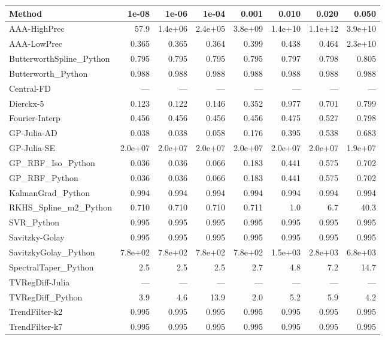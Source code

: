 \documentclass[10pt]{article}
\begin{document}
\begin{longtable}{lrrrrrrr}
\toprule
\textbf{Method} & \textbf{1e-08} & \textbf{1e-06} & \textbf{1e-04} & \textbf{0.001} & \textbf{0.010} & \textbf{0.020} & \textbf{0.050} \\
\midrule
\endhead
AAA-HighPrec & 57.9 & 1.4e+06 & 2.4e+05 & 3.8e+09 & 1.4e+10 & 1.1e+12 & 3.9e+10 \\
AAA-LowPrec & 0.365 & 0.365 & 0.364 & 0.399 & 0.438 & 0.464 & 2.3e+10 \\
ButterworthSpline\_Python & 0.795 & 0.795 & 0.795 & 0.795 & 0.797 & 0.798 & 0.805 \\
Butterworth\_Python & 0.988 & 0.988 & 0.988 & 0.988 & 0.988 & 0.988 & 0.988 \\
Central-FD & --- & --- & --- & --- & --- & --- & --- \\
Dierckx-5 & 0.123 & 0.122 & 0.146 & 0.352 & 0.977 & 0.701 & 0.799 \\
Fourier-Interp & 0.456 & 0.456 & 0.456 & 0.456 & 0.475 & 0.527 & 0.798 \\
GP-Julia-AD & 0.038 & 0.038 & 0.058 & 0.176 & 0.395 & 0.538 & 0.683 \\
GP-Julia-SE & 2.0e+07 & 2.0e+07 & 2.0e+07 & 2.0e+07 & 2.0e+07 & 2.0e+07 & 1.9e+07 \\
GP\_RBF\_Iso\_Python & 0.036 & 0.036 & 0.066 & 0.183 & 0.441 & 0.575 & 0.702 \\
GP\_RBF\_Python & 0.036 & 0.036 & 0.066 & 0.183 & 0.441 & 0.575 & 0.702 \\
KalmanGrad\_Python & 0.994 & 0.994 & 0.994 & 0.994 & 0.994 & 0.994 & 0.994 \\
RKHS\_Spline\_m2\_Python & 0.710 & 0.710 & 0.710 & 0.711 & 1.0 & 6.7 & 40.3 \\
SVR\_Python & 0.995 & 0.995 & 0.995 & 0.995 & 0.995 & 0.995 & 0.995 \\
Savitzky-Golay & 0.995 & 0.995 & 0.995 & 0.995 & 0.995 & 0.995 & 0.995 \\
SavitzkyGolay\_Python & 7.8e+02 & 7.8e+02 & 7.8e+02 & 7.8e+02 & 1.5e+03 & 2.8e+03 & 6.8e+03 \\
SpectralTaper\_Python & 2.5 & 2.5 & 2.5 & 2.7 & 4.8 & 7.2 & 14.7 \\
TVRegDiff-Julia & --- & --- & --- & --- & --- & --- & --- \\
TVRegDiff\_Python & 3.9 & 4.6 & 13.9 & 2.0 & 5.2 & 5.9 & 4.2 \\
TrendFilter-k2 & 0.995 & 0.995 & 0.995 & 0.995 & 0.995 & 0.995 & 0.995 \\
TrendFilter-k7 & 0.995 & 0.995 & 0.995 & 0.995 & 0.995 & 0.995 & 0.995 \\

\end{longtable}
\end{document}
